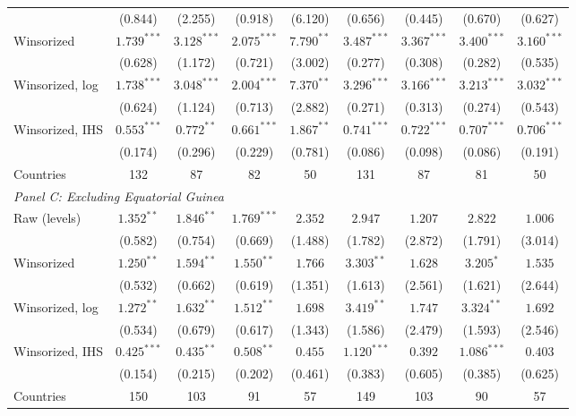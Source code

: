 \begin{table}[htbp]
{\begin{tabular}{lcccccccc}
 & (0.844) & (2.255) & (0.918) & (6.120) & (0.656) & (0.445) & (0.670) & (0.627) \\
Winsorized & $1.739^{***}$ & $3.128^{***}$ & $2.075^{***}$ & $7.790^{**}$ & $3.487^{***}$ & $3.367^{***}$ & $3.400^{***}$ & $3.160^{***}$ \\
 & (0.628) & (1.172) & (0.721) & (3.002) & (0.277) & (0.308) & (0.282) & (0.535) \\
Winsorized, log & $1.738^{***}$ & $3.048^{***}$ & $2.004^{***}$ & $7.370^{**}$ & $3.296^{***}$ & $3.166^{***}$ & $3.213^{***}$ & $3.032^{***}$ \\
 & (0.624) & (1.124) & (0.713) & (2.882) & (0.271) & (0.313) & (0.274) & (0.543) \\
Winsorized, IHS & $0.553^{***}$ & $0.772^{**}$ & $0.661^{***}$ & $1.867^{**}$ & $0.741^{***}$ & $0.722^{***}$ & $0.707^{***}$ & $0.706^{***}$ \\
 & (0.174) & (0.296) & (0.229) & (0.781) & (0.086) & (0.098) & (0.086) & (0.191) \\
Countries & 132 & 87 & 82 & 50 & 131 & 87 & 81 & 50 \\
\midrule
\multicolumn{9}{l}{\textit{Panel C: Excluding Equatorial Guinea}} \\
Raw (levels) & $1.352^{**}$ & $1.846^{**}$ & $1.769^{***}$ & $2.352$ & $2.947$ & $1.207$ & $2.822$ & $1.006$ \\
 & (0.582) & (0.754) & (0.669) & (1.488) & (1.782) & (2.872) & (1.791) & (3.014) \\
Winsorized & $1.250^{**}$ & $1.594^{**}$ & $1.550^{**}$ & $1.766$ & $3.303^{**}$ & $1.628$ & $3.205^{*}$ & $1.535$ \\
 & (0.532) & (0.662) & (0.619) & (1.351) & (1.613) & (2.561) & (1.621) & (2.644) \\
Winsorized, log & $1.272^{**}$ & $1.632^{**}$ & $1.512^{**}$ & $1.698$ & $3.419^{**}$ & $1.747$ & $3.324^{**}$ & $1.692$ \\
 & (0.534) & (0.679) & (0.617) & (1.343) & (1.586) & (2.479) & (1.593) & (2.546) \\
Winsorized, IHS & $0.425^{***}$ & $0.435^{**}$ & $0.508^{**}$ & $0.455$ & $1.120^{***}$ & $0.392$ & $1.086^{***}$ & $0.403$ \\
 & (0.154) & (0.215) & (0.202) & (0.461) & (0.383) & (0.605) & (0.385) & (0.625) \\
Countries & 150 & 103 & 91 & 57 & 149 & 103 & 90 & 57 \\
\bottomrule
\end{tabular}}
\par\vspace{4pt}

\end{table}
